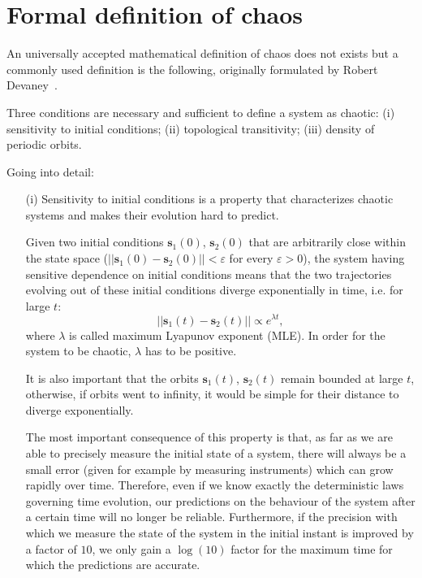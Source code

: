 \section{Formal definition of chaos}\label{sec: chaos in theory}

An universally accepted mathematical definition of chaos does not exists but
a commonly used definition is the following, originally formulated by Robert
Devaney~\cite{ref:chaos_definition}.

Three conditions are necessary and
sufficient to define a system as chaotic: (i) sensitivity to initial conditions;
(ii) topological transitivity;
(iii) density of periodic orbits.

Going into detail:
\begin{itemize}
    \item[(i)] Sensitivity to initial conditions is a property that characterizes chaotic
    systems and makes their evolution hard to predict.

    Given two initial conditions $\mathbf{s}_1(0)$, $\mathbf{s}_2(0)$ that are arbitrarily close within the state
    space ($||\mathbf{s}_1(0)-\mathbf{s}_2(0)||<\varepsilon$ for every $\varepsilon > 0$),
    the system having sensitive dependence on initial conditions means that
    the two trajectories evolving out of these initial conditions diverge exponentially in time, i.e.
    for large $t$:
    \begin{equation}
    \label{eq: trajectory divergence}
        ||\mathbf{s}_1(t)-\mathbf{s}_2(t)||\propto e^{\lambda t},
    \end{equation}
    where $\lambda$ is called maximum Lyapunov exponent (MLE).
    In order for the system to be chaotic, $\lambda$ has to be positive.

    It is also important that the orbits $\mathbf{s}_1(t)$, $\mathbf{s}_2(t)$ remain bounded at large $t$,
    otherwise, if orbits went to infinity, it would be simple for their distance to diverge exponentially.
    
    The most important consequence of this property is that, as far as we are
    able to precisely measure the initial state of a system, there will always be
    a small error (given for example by measuring instruments) which can grow
    rapidly over time. Therefore, even if we know exactly the deterministic laws
    governing time evolution, our predictions on the behaviour of the system
    after a certain time will no longer be reliable. Furthermore, if the precision
    with which we measure the state of the system in the initial instant is
    improved by a factor of $10$, we only gain a $\log(10)$ factor for the maximum
    time for which the predictions are accurate.


\end{itemize}
